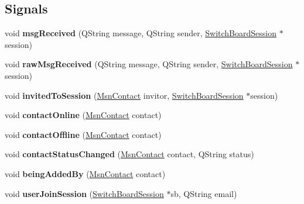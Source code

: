 \subsection*{Signals}
\begin{DoxyCompactItemize}
\item 
\hypertarget{classMsn_aba018794aa94476d447765c836c6c69d}{
void {\bfseries msgReceived} (QString message, QString sender, \hyperlink{classSwitchBoardSession}{SwitchBoardSession} $\ast$session)}
\label{classMsn_aba018794aa94476d447765c836c6c69d}

\item 
\hypertarget{classMsn_ae53ae3b871d26efefb840ea42e8c90a1}{
void {\bfseries rawMsgReceived} (QString message, QString sender, \hyperlink{classSwitchBoardSession}{SwitchBoardSession} $\ast$session)}
\label{classMsn_ae53ae3b871d26efefb840ea42e8c90a1}

\item 
\hypertarget{classMsn_a8b6cb40cb5b089087fca2143f46bf512}{
void {\bfseries invitedToSession} (\hyperlink{classMsnContact}{MsnContact} invitor, \hyperlink{classSwitchBoardSession}{SwitchBoardSession} $\ast$session)}
\label{classMsn_a8b6cb40cb5b089087fca2143f46bf512}

\item 
\hypertarget{classMsn_a5980c33d1c9d5f41b7b7a9b355ed966a}{
void {\bfseries contactOnline} (\hyperlink{classMsnContact}{MsnContact} contact)}
\label{classMsn_a5980c33d1c9d5f41b7b7a9b355ed966a}

\item 
\hypertarget{classMsn_aa8425b196e9f19493a1413a924883d25}{
void {\bfseries contactOffline} (\hyperlink{classMsnContact}{MsnContact} contact)}
\label{classMsn_aa8425b196e9f19493a1413a924883d25}

\item 
\hypertarget{classMsn_a5473c5582f65220fae3f068aed91332e}{
void {\bfseries contactStatusChanged} (\hyperlink{classMsnContact}{MsnContact} contact, QString status)}
\label{classMsn_a5473c5582f65220fae3f068aed91332e}

\item 
\hypertarget{classMsn_aed7345010e54e133b6f8c74ae5aaaa98}{
void {\bfseries beingAddedBy} (\hyperlink{classMsnContact}{MsnContact} contact)}
\label{classMsn_aed7345010e54e133b6f8c74ae5aaaa98}

\item 
\hypertarget{classMsn_a0b7ff4e1ea5ba0ed522dbaffc681c928}{
void {\bfseries userJoinSession} (\hyperlink{classSwitchBoardSession}{SwitchBoardSession} $\ast$sb, QString email)}
\label{classMsn_a0b7ff4e1ea5ba0ed522dbaffc681c928}


\end{DoxyCompactItemize}
